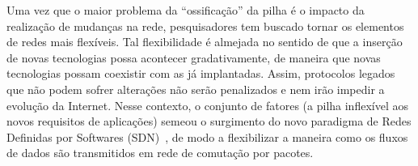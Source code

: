 \documentclass[	12pt, Times, openright, twoside, a4paper, english, brazil]{abntex2}
\begin{document}
Uma vez que o maior problema da ``ossificação'' da pilha  é o impacto da realização de mudanças na rede, pesquisadores tem buscado tornar os elementos de redes mais flexíveis. Tal flexibilidade é almejada no sentido de que a inserção  de novas tecnologias possa acontecer gradativamente, de maneira que novas tecnologias possam coexistir com as já implantadas. Assim, protocolos legados que não podem sofrer alterações não serão penalizados e nem irão impedir a evolução da Internet. Nesse contexto, o conjunto de fatores (a pilha inflexível aos novos requisitos de aplicações) semeou o surgimento do novo paradigma de Redes Definidas por Softwares (SDN)~\cite{McKeown}, de modo a flexibilizar a maneira como os fluxos de dados são transmitidos em rede de comutação por pacotes.


\end{document}
